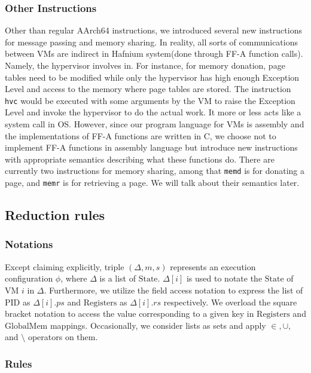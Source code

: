 \documentclass[a4paper]{article}
\newcommand*{\STATE}{\text{State}}
\newcommand*{\MEM}{\text{GlobalMem}}
\newcommand*{\PID}{\text{PID}}
\newcommand*{\REGS}{\text{Registers}}
\begin{document}
\subsubsection{Other Instructions}
Other than regular AArch64 instructions, we introduced several new instructions
for message passing and memory sharing. In reality, all sorts of communications
between VMs are indirect in Hafnium system(done through FF-A function calls).
Namely, the hypervisor involves in. For instance, for memory donation, page
tables need to be modified while only the hypervisor has high enough Exception
Level and access to the memory where page tables are stored. The instruction
\texttt{hvc} would be executed with some arguments by the VM to raise the
Exception Level and invoke the hypervisor to do the actual work. It more or less
acts like a system call in OS. However, since our program language for VMs is
assembly and the implementations of FF-A functions are written in C, we choose
not to implement FF-A functions in assembly language but introduce new
instructions with appropriate semantics describing what these functions do.
There are currently two instructions for memory sharing, among that
\texttt{memd} is for donating a page, and \texttt{memr} is for retrieving a
page. We will talk about their semantics later.




\subsection{Reduction rules}
\subsubsection{Notations}
Except claiming explicitly, triple $(\Delta, m, s)$ represents an execution
configuration $\phi$, where $\Delta$ is a list of $\STATE$. $\Delta[i]$ is used
to notate the $\STATE$ of VM $i$ in $\Delta$. Furthermore, we utilize the field
access notation to express the list of $\PID$ as $\Delta[i].ps$ and $\REGS$ as
$\Delta[i].rs$ respectively. We overload the square bracket notation to access
the value corresponding to a given key in $\REGS$ and $\MEM$ mappings. Occasionally, we
consider lists as sets and apply $\in, \cup,$ and $\setminus$ operators on them.


\subsubsection{Rules}
\end{document}
